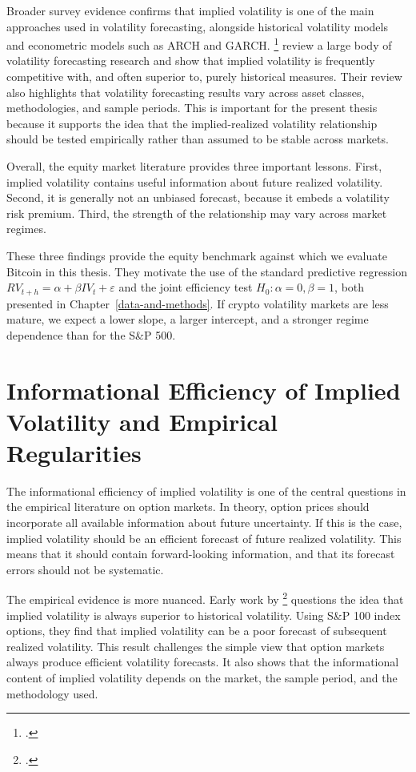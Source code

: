 \documentclass[11pt,a4paper,openany]{report}
\newcommand{\fcitet}[1]{\citet{#1}\footnote{\bibentry{#1}.}}
\begin{document}
Broader survey evidence confirms that implied volatility is one of the
main approaches used in volatility forecasting, alongside historical
volatility models and econometric models such as ARCH and GARCH. \fcitet{poon2003} review a large body of
volatility forecasting research and show that implied volatility is
frequently competitive with, and often superior to, purely historical
measures. Their review also highlights that volatility forecasting
results vary across asset classes, methodologies, and sample periods.
This is important for the present thesis because it supports the idea
that the implied-realized volatility relationship should be tested
empirically rather than assumed to be stable across markets.

Overall, the equity market literature provides three important lessons.
First, implied volatility contains useful information about future
realized volatility. Second, it is generally not an unbiased forecast,
because it embeds a volatility risk premium. Third, the strength of the
relationship may vary across market regimes.

These three findings provide the equity benchmark against which we
evaluate Bitcoin in this thesis. They motivate the use of the standard
predictive regression $RV_{t+h}=\alpha+\beta IV_t+\varepsilon$ and the
joint efficiency test $H_0:\alpha=0,\beta=1$, both presented in
Chapter~\ref{data-and-methods}. If crypto volatility markets are less
mature, we expect a lower slope, a larger intercept, and a stronger
regime dependence than for the S\&P 500.

\section{Informational Efficiency of Implied Volatility and Empirical
Regularities}\label{informational-efficiency-of-implied-volatility-and-empirical-regularities}

The informational efficiency of implied volatility is one of the central
questions in the empirical literature on option markets. In theory,
option prices should incorporate all available information about future
uncertainty. If this is the case, implied volatility should be an
efficient forecast of future realized volatility. This means that it
should contain forward-looking information, and that its forecast errors
should not be systematic.

The empirical evidence is more nuanced. Early work by \fcitet{canina1993} questions the idea that implied
volatility is always superior to historical volatility. Using S\&P 100
index options, they find that implied volatility can be a poor forecast
of subsequent realized volatility. This result challenges the simple
view that option markets always produce efficient volatility forecasts.
It also shows that the informational content of implied volatility
depends on the market, the sample period, and the methodology used.
\end{document}
